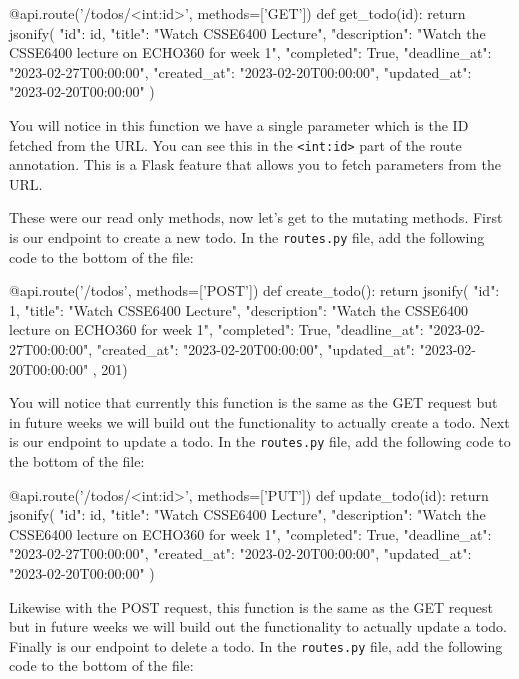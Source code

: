 \documentclass{csse4400}
\begin{document}
\begin{code}[language=python]{}
  @api.route('/todos/<int:id>', methods=['GET'])
  def get_todo(id):
      return jsonify({
        "id": id,
        "title": "Watch CSSE6400 Lecture",
        "description": "Watch the CSSE6400 lecture on ECHO360 for week 1",
        "completed": True,
        "deadline_at": "2023-02-27T00:00:00",
        "created_at": "2023-02-20T00:00:00",
        "updated_at": "2023-02-20T00:00:00"
      })
\end{code}

You will notice in this function we have a single parameter which is the ID fetched from the URL. You can see this in the \texttt{<int:id>} part of the route annotation. This is a Flask feature that allows you to fetch parameters from the URL. 

These were our read only methods, now let's get to the mutating methods. First is our endpoint to create a new todo. In the \texttt{routes.py} file, add the following code to the bottom of the file:

\begin{code}[language=python]{}
  @api.route('/todos', methods=['POST'])
  def create_todo():
      return jsonify({
        "id": 1,
        "title": "Watch CSSE6400 Lecture",
        "description": "Watch the CSSE6400 lecture on ECHO360 for week 1",
        "completed": True,
        "deadline_at": "2023-02-27T00:00:00",
        "created_at": "2023-02-20T00:00:00",
        "updated_at": "2023-02-20T00:00:00"
      }, 201)
\end{code}

You will notice that currently this function is the same as the GET request but in future weeks we will build out the functionality to actually create a todo. Next is our endpoint to update a todo. In the \texttt{routes.py} file, add the following code to the bottom of the file:

\begin{code}[language=python]{}
  @api.route('/todos/<int:id>', methods=['PUT'])
  def update_todo(id):
      return jsonify({
        "id": id,
        "title": "Watch CSSE6400 Lecture",
        "description": "Watch the CSSE6400 lecture on ECHO360 for week 1",
        "completed": True,
        "deadline_at": "2023-02-27T00:00:00",
        "created_at": "2023-02-20T00:00:00",
        "updated_at": "2023-02-20T00:00:00"
      })
\end{code}

Likewise with the POST request, this function is the same as the GET request but in future weeks we will build out the functionality to actually update a todo. Finally is our endpoint to delete a todo. In the \texttt{routes.py} file, add the following code to the bottom of the file:
\end{document}
